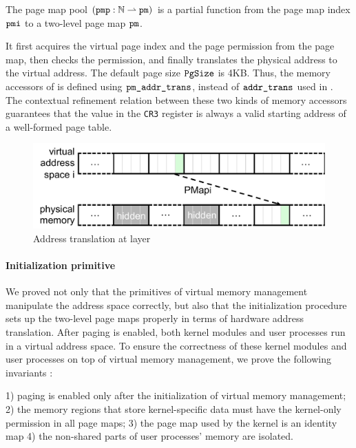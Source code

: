 The page map pool $(\code{pmp}: \integer\partialf \code{pm})$
is a partial function from the page map index $\code{pmi}$
to a two-level page map $\code{pm}$.

\begin{mathpar}
\end{mathpar}
It first acquires the virtual page index and the page permission
from the page map,
then checks the permission,
and finally translates the physical address
to the virtual address.
The default page size $\code{PgSize}$ is 4KB.
Thus, the memory accessors of  is defined
using $\code{pm\_addr\_trans}$, instead of
$\code{addr\_trans}$ used in .
 The contextual refinement relation
between these two kinds of memory accessors guarantees that the
value in the \verb"CR3" register is always a valid starting address of
a well-formed page table.

\begin{figure}[t]\centering
\includegraphics[scale=.55]{figs/mem_model_2} 
\caption{Address translation at  layer}
\label{fig:seq:mem2}
\hrulefill
\end{figure}

\paragraph{Initialization primitive}
We proved not only that the primitives of virtual memory management
manipulate the address space correctly,
but also that the initialization procedure sets up the two-level page maps properly
in terms of hardware address translation.
After paging is enabled, both kernel modules and user processes
run in a virtual address space.
To ensure the correctness of these kernel modules and user processes on top of virtual memory
management, we prove the following invariants :
\begin{invariant}
\label{inv:seq:virtual}
1) paging is enabled only after the initialization of virtual memory management;
2) the memory regions that store kernel-specific data must have the kernel-only 
permission in all page maps;
3) the page map used by the kernel is an identity map
4) the non-shared parts of user processes' memory are isolated.
\end{invariant}

